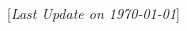 \documentclass[letterpaper,MMMyyyy,nonstopmode]{simpleresumecv}
\newcommand{\CVNote}{Last Update on \today}
\begin{document}
\begin{Body}
\begin{multicols}{2}
\begin{itemize}[leftmargin=*]
\end{itemize}
\end{multicols}






\UseNoteFont
\hfill[\textit{\CVNote}]

\end{Body}
\end{document}

